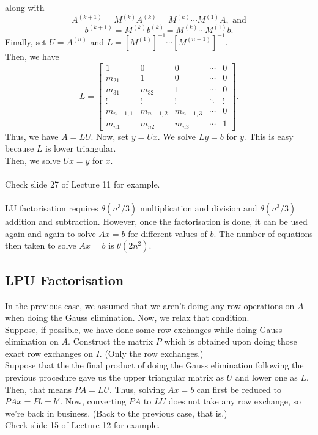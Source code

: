 \documentclass[12pt]{article}
\theoremstyle{definition}
\begin{document}
along with
\[A^{(k+1)} = M^{(k)}A^{(k)} = M^{(k)}\cdots M^{(1)}A, \text{ and}\]
\[b^{(k+1)} = M^{(k)}b^{(k)} = M^{(k)}\cdots M^{(1)}b.\]
Finally, set $U = A^{(n)}$ and $L = [M^{(1)}]^{-1}\cdots \left[M^{(n-1)}\right]^{-1}.$\\
Then, we have
\[L = 
\begin{bmatrix}
	1 & 0 & 0 & \cdots & 0\\
	m_{21} & 1 & 0 & \cdots & 0\\
	m_{31} & m_{32} & 1 & \cdots & 0\\
	\vdots & \vdots & \vdots & \ddots & \vdots\\
	m_{n-1, 1} & m_{n-1, 2} & m_{n-1, 3} & \cdots & 0\\
	m_{n1} & m_{n2} & m_{n3} & \cdots & 1
\end{bmatrix}.\] 
Thus, we have $A = LU.$ Now, set $y = Ux.$ We solve $Ly = b$ for $y.$ This is easy because $L$ is lower triangular.\\
Then, we solve $Ux = y$ for $x.$\\~\\
Check slide 27 of Lecture 11 for example.\\~\\
LU factorisation requires $\theta(n^3/3)$ multiplication and division and $\theta(n^3/3)$ addition and subtraction. However, once the factorisation is done, it can be used again and again to solve $Ax = b$ for different values of $b.$ The number of equations then taken to solve $Ax = b$ is $\theta(2n^2).$

\subsection{LPU Factorisation}
In the previous case, we assumed that we aren't doing any row operations on $A$ when doing the Gauss elimination. Now, we relax that condition.\\
Suppose, if possible, we have done some row exchanges while doing Gauss elimination on $A.$ Construct the matrix $P$ which is obtained upon doing those exact row exchanges on $I.$ (Only the row exchanges.)\\
Suppose that the the final product of doing the Gauss elimination following the previous procedure gave us the upper triangular matrix as $U$ and lower one as $L.$\\
Then, that means $PA = LU.$ Thus, solving $Ax = b$ can first be reduced to $PAx = Pb = b'.$ Now, converting $PA$ to $LU$ does not take any row exchange, so we're back in business. (Back to the previous case, that is.)\\
Check slide 15 of Lecture 12 for example.
\end{document}
